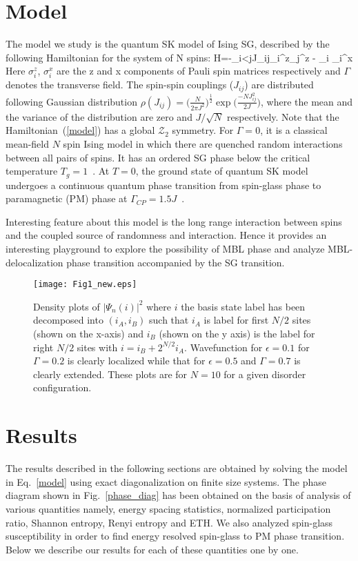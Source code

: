 \documentclass[prl,aps,twocolumn,floats,nofootinbib]{revtex4}
\begin{document}
\section{Model}
The model we study is the quantum SK model of Ising SG, described by the following Hamiltonian for the system of N spins:
\bea
H=-\sum_{i<j}J_{ij}\sigma_i^z\sigma_j^z - \Gamma\sum_i \sigma_i^x
\label{model}
\eea
Here $\sigma_i^z$, $\sigma_i^x$ are the z and x components of Pauli spin matrices respectively and $\Gamma$ denotes the transverse field. 
The spin-spin couplings ($J_{ij}$) are distributed following Gaussian distribution $\rho(J_{ij}) = \big(\frac{N}{2\pi J^2}\big)^\frac{1}{2}\exp\big(\frac{-N J^2_{ij}}{2J}\big)$, where the mean and the variance of the distribution are zero and $J/\sqrt{N}$ respectively. Note that the Hamiltonian~(\ref{model}) has a global $\mathcal{Z}_2$ symmetry. 
For $\Gamma=0$, it is a classical mean-field $N$ spin Ising model in which there are quenched random interactions between all pairs of spins.
 It has an ordered SG phase below the critical temperature $T_g = 1$~\cite{Campbell}.
At $T=0$, the ground state of quantum SK model undergoes a continuous quantum phase transition from spin-glass phase to paramagnetic (PM) phase at $\Gamma_{CP}=1.5J$~\cite{QSK}.

Interesting feature about this model is the long range interaction between spins and the coupled source of randomness and interaction. Hence it provides an interesting playground to explore the possibility of MBL phase and analyze MBL-delocalization phase transition accompanied by the SG transition.
\begin{figure}[h!]
\begin{center}
\texttt{[image: Fig1\_new.eps]}
\caption{Density plots of $|\Psi_n(i)|^2$ where $i$ the basis state label has been decomposed into $(i_A,i_B)$ such that $i_A$ is label for first $N/2$ sites (shown on the x-axis) and $i_B$ (shown on the y axis) is the label for right $N/2$ sites with $i=i_B+ 2^{N/2}i_A$. Wavefunction for $\epsilon=0.1$ for $\Gamma=0.2$ is clearly localized while that for $\epsilon=0.5$ and $\Gamma=0.7$ is clearly extended. These plots are for $N=10$ for a given disorder configuration.}
\label{wvfn}
\end{center}
\end{figure}
\section{Results}
The results described in the following sections are obtained by solving the model in Eq.~\ref{model} using exact diagonalization on finite size systems. 
The phase diagram shown in Fig.~\ref{phase_diag} has been obtained on the basis of analysis of various quantities namely, energy spacing statistics, normalized participation ratio, Shannon entropy, Renyi entropy and ETH. We also analyzed spin-glass susceptibility in order to find energy resolved spin-glass to PM phase transition. Below we describe our results for each of these quantities one by one. 
\end{document}
